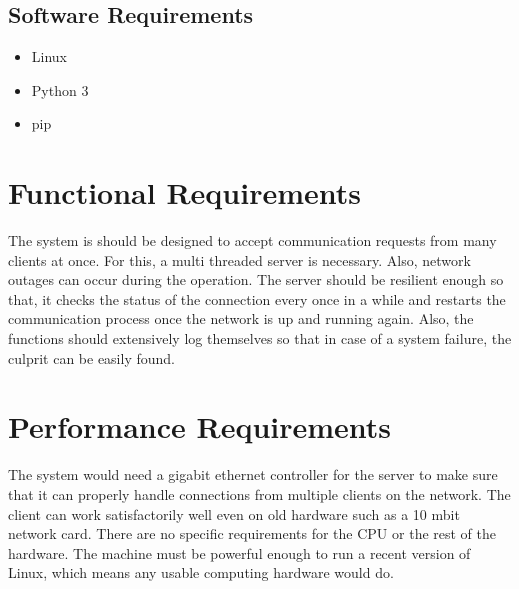 \subsection{Software Requirements}
\begin{itemize}
    \item Linux
    \item Python 3
    \item pip
\end{itemize}

\section{Functional Requirements}
The system is should be designed to accept communication requests from many
clients at once. For this, a multi threaded server is necessary. Also, network
outages can occur during the operation. The server should be resilient enough
so that, it checks the status of the connection every once in a while and
restarts the communication process once the network is up and running again.
Also, the functions should extensively log themselves so that in case of a
system failure, the culprit can be easily found.

\section{Performance Requirements}
The system would need a gigabit ethernet controller for the server to make sure
that it can properly handle connections from multiple clients on the network.
The client can work satisfactorily well even on old hardware such as a 10 mbit
network card. There are no specific requirements for the CPU or the rest of the
hardware. The machine must be powerful enough to run a recent version of Linux,
which means any usable computing hardware would do.

